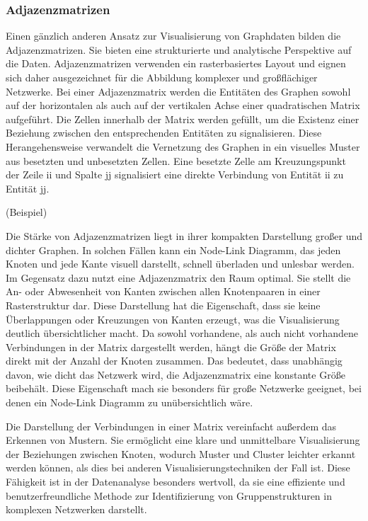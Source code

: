 \subsubsection{Adjazenzmatrizen}

Einen gänzlich anderen Ansatz zur Visualisierung von Graphdaten bilden die Adjazenzmatrizen. Sie bieten eine strukturierte und analytische Perspektive auf die Daten. Adjazenzmatrizen verwenden ein rasterbasiertes Layout und eignen sich daher ausgezeichnet für die Abbildung komplexer und großflächiger Netzwerke. Bei einer Adjazenzmatrix werden die Entitäten des Graphen sowohl auf der horizontalen als auch auf der vertikalen Achse einer quadratischen Matrix aufgeführt. Die Zellen innerhalb der Matrix werden gefüllt, um die Existenz einer Beziehung zwischen den entsprechenden Entitäten zu signalisieren. Diese Herangehensweise verwandelt die Vernetzung des Graphen in ein visuelles Muster aus besetzten und unbesetzten Zellen. Eine besetzte Zelle am Kreuzungspunkt der Zeile ii und Spalte jj signalisiert eine direkte Verbindung von Entität ii zu Entität jj.

(Beispiel)

Die Stärke von Adjazenzmatrizen liegt in ihrer kompakten Darstellung großer und dichter Graphen. In solchen Fällen kann ein Node-Link Diagramm, das jeden Knoten und jede Kante visuell darstellt, schnell überladen und unlesbar werden. Im Gegensatz dazu nutzt eine Adjazenzmatrix den Raum optimal. Sie stellt die An- oder Abwesenheit von Kanten zwischen allen Knotenpaaren in einer Rasterstruktur dar. Diese Darstellung hat die Eigenschaft, dass sie keine Überlappungen oder Kreuzungen von Kanten erzeugt, was die Visualisierung deutlich übersichtlicher macht. Da sowohl vorhandene, als auch nicht vorhandene Verbindungen in der Matrix dargestellt werden, hängt die Größe der Matrix direkt mit der Anzahl der Knoten zusammen. Das bedeutet, dass unabhängig davon, wie dicht das Netzwerk wird, die Adjazenzmatrix eine konstante Größe beibehält. Diese Eigenschaft mach sie besonders für große Netzwerke geeignet, bei denen ein Node-Link Diagramm zu unübersichtlich wäre. 

Die Darstellung der Verbindungen in einer Matrix vereinfacht außerdem das Erkennen von Mustern. Sie ermöglicht eine klare und unmittelbare Visualisierung der Beziehungen zwischen Knoten, wodurch Muster und Cluster leichter erkannt werden können, als dies bei anderen Visualisierungstechniken der Fall ist. Diese Fähigkeit ist in der Datenanalyse besonders wertvoll, da sie eine effiziente und benutzerfreundliche Methode zur Identifizierung von Gruppenstrukturen in komplexen Netzwerken darstellt.

